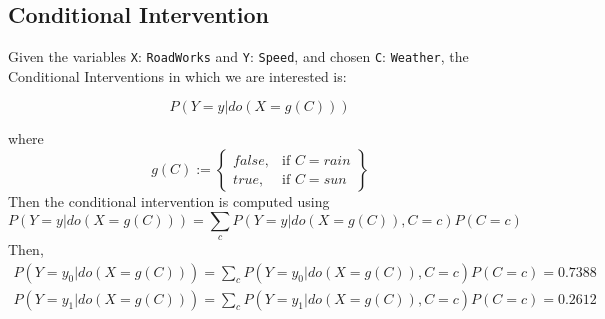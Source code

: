 \documentclass[a4paper,12pt]{article} %
\begin{document}
\subsection*{Conditional Intervention}
Given the variables \texttt{X}: \texttt{RoadWorks} and \texttt{Y}: \texttt{Speed}, and chosen \texttt{C}: \texttt{Weather}, the Conditional Interventions in which we are interested is: 

$$P(Y=y|do(X=g(C)))$$

where $$ g(C) := \left\{\begin{array}{lr}
false, & \text{if } C=rain\\
true, & \text{if } C=sun
\end{array}\right\}$$
Then the conditional intervention is computed using 
\begin{equation}
	P(Y=y|do(X=g(C))) = \sum_c P(Y=y|do(X=g(C)), C=c)P(C=c)
\end{equation}
Then, 
\begin{equation*}
\begin{aligned}
P(Y=y_0|do(X=g(C))) = \sum_c P(Y=y_0|do(X=g(C)), C=c)P(C=c) = 0.7388\\
P(Y=y_1|do(X=g(C))) = \sum_c P(Y=y_1|do(X=g(C)), C=c)P(C=c) = 0.2612
\end{aligned}
\end{equation*}
\end{document}
